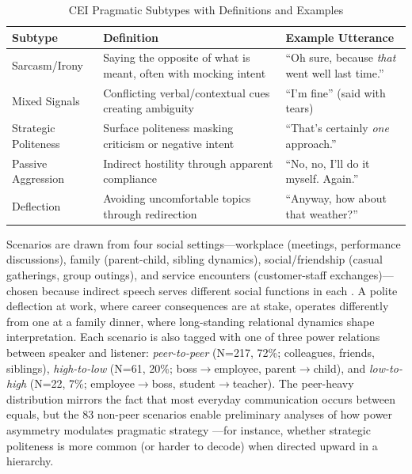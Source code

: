 \documentclass[twoside,11pt]{article}
\begin{document}
\begin{table}[t]
\caption{CEI Pragmatic Subtypes with Definitions and Examples}
\label{tab:subtypes}
\centering
\small
\begin{tabular}{@{}p{2.2cm}p{4.5cm}p{5.5cm}@{}}
\toprule
\textbf{Subtype} & \textbf{Definition} & \textbf{Example Utterance} \\
\midrule
Sarcasm/Irony & Saying the opposite of what is meant, often with mocking intent & ``Oh sure, because \textit{that} went well last time.'' \\
\addlinespace
Mixed Signals & Conflicting verbal/contextual cues creating ambiguity & ``I'm fine'' (said with tears) \\
\addlinespace
Strategic Politeness & Surface politeness masking criticism or negative intent & ``That's certainly \textit{one} approach.'' \\
\addlinespace
Passive Aggression & Indirect hostility through apparent compliance & ``No, no, I'll do it myself. Again.'' \\
\addlinespace
Deflection & Avoiding uncomfortable topics through redirection & ``Anyway, how about that weather?'' \\
\bottomrule
\end{tabular}
\end{table}

Scenarios are drawn from four social settings---workplace (meetings, performance discussions), family (parent-child, sibling dynamics), social/friendship (casual gatherings, group outings), and service encounters (customer-staff exchanges)---chosen because indirect speech serves different social functions in each \citep{pinker2008logic}. A polite deflection at work, where career consequences are at stake, operates differently from one at a family dinner, where long-standing relational dynamics shape interpretation. Each scenario is also tagged with one of three power relations between speaker and listener: \textit{peer-to-peer} (N=217, 72\%; colleagues, friends, siblings), \textit{high-to-low} (N=61, 20\%; boss$\rightarrow$employee, parent$\rightarrow$child), and \textit{low-to-high} (N=22, 7\%; employee$\rightarrow$boss, student$\rightarrow$teacher). The peer-heavy distribution mirrors the fact that most everyday communication occurs between equals, but the 83 non-peer scenarios enable preliminary analyses of how power asymmetry modulates pragmatic strategy \citep{prabhakaran2012power}---for instance, whether strategic politeness is more common (or harder to decode) when directed upward in a hierarchy.
\end{document}
